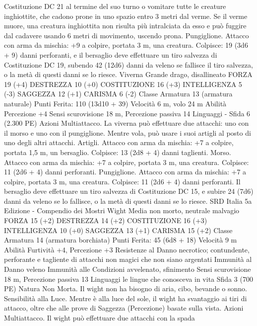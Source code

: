 \begin{multicols}{2}
Costituzione DC 21 al termine del suo turno o vomitare tutte le
creature inghiottite, che cadono prone in uno spazio entro 3 metri
dal verme. Se il verme muore, una creatura inghiottita non risulta
più intralciata da esso e può fuggire dal cadavere usando 6 metri
di movimento, uscendo prona.
Pungiglione. Attacco con arma da mischia: +9 a colpire, portata
3 m, una creatura.
Colpisce: 19 (3d6 + 9) danni perforanti, e il bersaglio deve
effettuare un tiro salvezza di Costituzione DC 19, subendo 42
(12d6) danni da veleno se fallisce il tiro salvezza, o la metà di
questi danni se lo riesce.
Viverna
Grande drago, disallineato
FORZA 19 (+4)
DESTREZZA 10 (+0)
COSTITUZIONE 16 (+3)
INTELLIGENZA 5 (-3)
SAGGEZZA 12 (+1)
CARISMA 6 (-2)
Classe Armatura 13 (armatura naturale)
\hspace*{0pt}\hfill{Punti Ferita}: 110 (13d10 + 39)
Velocità 6 m, volo 24 m
Abilità Percezione +4
Sensi scurovisione 18 m, Percezione passiva 14
Linguaggi -
Sfida 6 (2.300 PE)
Azioni
Multiattacco. La viverna può effettuare due attacchi: uno con il
morso e uno con il pungiglione. Mentre vola, può usare i suoi
artigli al posto di uno degli altri attacchi.
Artigli. Attacco con arma da mischia: +7 a colpire, portata 1,5
m, un bersaglio.
Colpisce: 13 (2d8 + 4) danni taglienti.
Morso. Attacco con arma da mischia: +7 a colpire, portata 3 m,
una creatura.
Colpisce: 11 (2d6 + 4) danni perforanti.
Pungiglione. Attacco con arma da mischia: +7 a colpire, portata
3 m, una creatura.
Colpisce: 11 (2d6 + 4) danni perforanti. Il bersaglio deve
effettuare un tiro salvezza di Costituzione DC 15, e subire 24
(7d6) danni da veleno se lo fallisce, o la metà di questi danni se
lo riesce.
SRD Italia 5a Edizione - Compendio dei Mostri
Wight
Media non morto, neutrale malvagio
FORZA 15 (+2)
DESTREZZA 14 (+2)
COSTITUZIONE 16 (+3)
INTELLIGENZA 10 (+0)
SAGGEZZA 13 (+1)
CARISMA 15 (+2)
Classe Armatura 14 (armatura borchiata)
\hspace*{0pt}\hfill{Punti Ferita}: 45 (6d8 + 18)
Velocità 9 m
Abilità Furtività +4, Percezione +3
Resistenze al Danno necrotico; contundente, perforante e
tagliente di attacchi non magici che non siano argentati
Immunità al Danno veleno
Immunità alle Condizioni avvelenato, sfinimento
Sensi scurovisione 18 m, Percezione passiva 13
Linguaggi le lingue che conosceva in vita
Sfida 3 (700 PE)
Natura Non Morta. Il wight non ha bisogno di aria, cibo,
bevande o sonno.
Sensibilità alla Luce. Mentre è alla luce del sole, il wight ha
svantaggio ai tiri di attacco, oltre che alle prove di Saggezza
(Percezione) basate sulla vista.
Azioni
Multiattacco. Il wight può effettuare due attacchi con la spada

\end{multicols}
